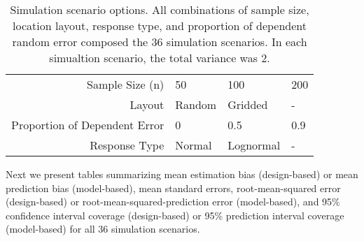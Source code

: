 \documentclass[]{elsarticle} %
\begin{document}
\begin{table}[ht]
\centering
\begin{tabular}{r|lll}
   \hline
Sample Size (n) & 50 & 100 & 200 \\ 
  Layout & Random & Gridded & - \\ 
  Proportion of Dependent Error & 0 & 0.5 & 0.9 \\ 
  Response Type & Normal & Lognormal & - \\ 
   \hline
\end{tabular}
\caption{\label{tab:parmtab} Simulation scenario options. All combinations of sample size, location layout, response type, and proportion of dependent random error composed the 36 simulation scenarios. In each simualtion scenario, the total variance was 2.} 
\end{table}

Next we present tables summarizing mean estimation bias (design-based)
or mean prediction bias (model-based), mean standard errors,
root-mean-squared error (design-based) or root-mean-squared-prediction
error (model-based), and 95\% confidence interval coverage
(design-based) or 95\% prediction interval coverage (model-based) for
all 36 simulation scenarios.
\end{document}
